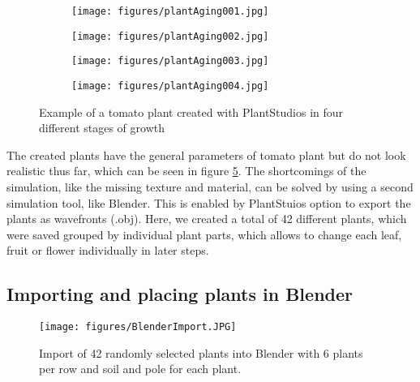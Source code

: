 \begin{figure}[h]
	\centering
	\begin{subfigure}{.24\textwidth}
		\centering
		\texttt{[image: figures/plantAging001.jpg]}
		\label{fig:sub1}
	\end{subfigure}
	\begin{subfigure}{.24\textwidth}
		\centering
		\texttt{[image: figures/plantAging002.jpg]}
		\label{fig:sub2}
	\end{subfigure}%
	\begin{subfigure}{.24\textwidth}
		\centering
		\texttt{[image: figures/plantAging003.jpg]}
		\label{fig:sub3}
	\end{subfigure}%
	\begin{subfigure}{.24\textwidth}
		\centering
		\texttt{[image: figures/plantAging004.jpg]}
		\label{fig:sub4}
	\end{subfigure}%
	\caption{Example of a tomato plant created with PlantStudios in four different stages of growth}
	\label{fig:plantStudio}
	\vspace{-10pt}
\end{figure} 


The created plants have the general parameters of tomato plant but do not look realistic thus far, which can be seen in figure \ref{fig:plantStudio}. The shortcomings of the simulation, like the missing texture and material, can be solved by using a second simulation tool, like Blender. This is enabled by PlantStuios option to export the plants as wavefronts (.obj). Here, we created a total of 42 different plants, which were saved grouped by individual plant parts, which allows to change each leaf, fruit or flower individually in later steps.



\subsection{Importing and placing plants in Blender}
\begin{wrapfigure}{r}{0.5\textwidth} 
	\vspace{-25pt}
	\begin{center}
		\texttt{[image: figures/BlenderImport.JPG]}
		\caption{Import of 42 randomly selected plants into Blender with 6 plants per row and soil and pole for each plant.}
		\label{fig:BlenderImport}
	\end{center}
	\vspace{-20pt}
	\vspace{1pt}
\end{wrapfigure} 

